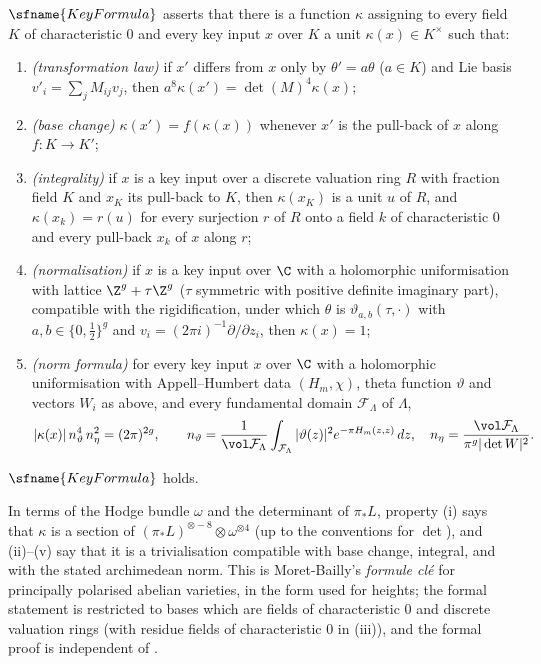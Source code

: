 \begin{definition}\label{pf:sh-local:def:key}
$\sfname{KeyFormula}$ asserts that there is a function $\kappa$ assigning to every field $K$ of characteristic $0$ and
every key input $x$ over $K$ a unit $\kappa(x)\in K^\times$ such that:
\begin{enumerate}[label=(\roman*)]
\item \emph{(transformation law)} if $x'$ differs from $x$ only by $\theta'=a\theta$ ($a\in K$) and Lie basis
$v'_i=\sum_jM_{ij}v_j$, then $a^8\kappa(x')=\det(M)^4\kappa(x)$;
\item \emph{(base change)} $\kappa(x')=f(\kappa(x))$ whenever $x'$ is the pull-back of $x$ along $f:K\to K'$;
\item \emph{(integrality)} if $x$ is a key input over a discrete valuation ring $R$ with fraction field $K$ and $x_K$ its
pull-back to $K$, then $\kappa(x_K)$ is a unit $u$ of $R$, and $\kappa(x_k)=r(u)$ for every surjection $r$ of $R$ onto a
field $k$ of characteristic $0$ and every pull-back $x_k$ of $x$ along $r$;
\item \emph{(normalisation)} if $x$ is a key input over $\C$ with a holomorphic uniformisation with lattice
$\Z^g+\tau\Z^g$ ($\tau$ symmetric with positive definite imaginary part), compatible with the rigidification, under
which $\theta$ is $\vartheta_{a,b}(\tau,\cdot)$ with $a,b\in\{0,\frac12\}^g$ and $v_i=(2\pi i)^{-1}\partial/\partial z_i$,
then $\kappa(x)=1$;
\item \emph{(norm formula)} for every key input $x$ over $\C$ with a holomorphic uniformisation with Appell--Humbert data
$(H_m,\chi)$, theta function $\vartheta$ and vectors $W_i$ as above, and every fundamental domain $\mathcal F_\Lambda$
of $\Lambda$,
\[
|\kappa(x)|\,n_\vartheta^4\,n_\eta^2=(2\pi)^{2g},\qquad
n_\vartheta=\frac1{\vol\mathcal F_\Lambda}\int_{\mathcal F_\Lambda}|\vartheta(z)|^2e^{-\pi H_m(z,z)}\,dz,\quad
n_\eta=\frac{\vol\mathcal F_\Lambda}{\pi^g|\det W|^2}.
\]
\end{enumerate}
\end{definition}

\begin{theorem}\label{pf:sh-local:key}
$\sfname{KeyFormula}$ holds.
\end{theorem}

\begin{remark}
In terms of the Hodge bundle $\omega$ and the determinant of $\pi_*L$, property (i) says that $\kappa$ is a section of
$(\pi_*L)^{\otimes-8}\otimes\omega^{\otimes4}$ (up to the conventions for $\det$), and (ii)--(v) say that it is a
trivialisation compatible with base change, integral, and with the stated archimedean norm. This is Moret-Bailly's
\emph{formule cl\'e} \cite{MoretBailly1985} for principally polarised abelian varieties, in the form used for heights;
the formal statement is restricted to bases which are fields of characteristic $0$ and discrete valuation rings (with
residue fields of characteristic $0$ in (iii)), and the formal proof is independent of \cite{MoretBailly1985}.
\end{remark}

